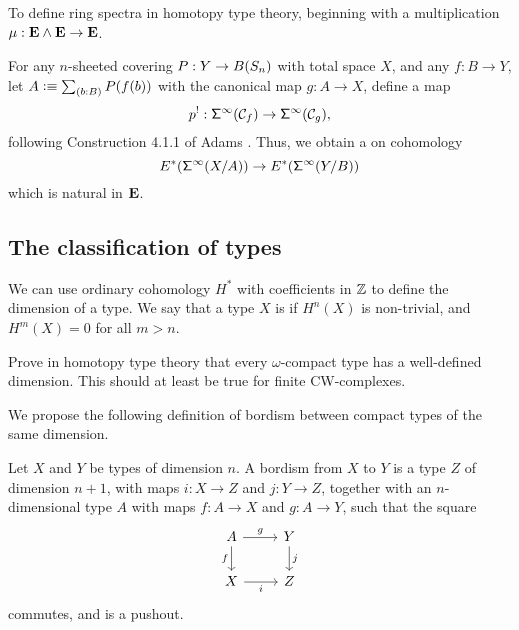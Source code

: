 \documentclass[reqno]{amsart}
\begin{document}
\begin{proposal}\label{p:ring_spectra}
To define ring spectra in homotopy type theory, beginning with a multiplication $\mu:\mathbf{E} \wedge \mathbf{E}\to\mathbf{E}$. 
\end{proposal}

\begin{proposal}\label{p:transfer_spectra}
For any $n$-sheeted covering $P:Y\to B(S_{n})$ with total space $X$, and any $f:B\to Y$, 
let $A\defeq \sm{b:B}P(f(b))$ with the canonical map $g:A\to X$, define a map
\begin{equation*}
p^! : \mathsf{\Sigma}^{\infty}(\mathcal{C}_{f})\to\mathsf{\Sigma}^{\infty}(\mathcal{C}_{g}),
\end{equation*}
following Construction 4.1.1 of Adams \cite{Adams78}. Thus, we obtain a 
on cohomology
\begin{equation*}
E^\ast(\mathsf{\Sigma}^{\infty}(X/A))\to E^\ast(\mathsf{\Sigma}^{\infty}(Y/B))
\end{equation*}
which is natural in $\mathbf{E}$.
\end{proposal}

\subsection{The classification of types}

We can use ordinary cohomology $H^\ast$ with coefficients in $\mathbb{Z}$ to define the dimension of a type. We say
that a type $X$ is  if $H^n(X)$ is non-trivial, and
$H^m(X)=0$ for all $m>n$. 

\begin{proposal}\label{p:dimension}
Prove in homotopy type theory that every $\omega$-compact type has a well-defined dimension. This should at least be true for finite CW-complexes.
\end{proposal}

We propose the following definition of bordism between
compact types of the same dimension.

\begin{defn}
Let $X$ and $Y$ be types of dimension $n$. A bordism from $X$ to $Y$
is a type $Z$ of dimension $n+1$, with maps $i:X\to Z$ and $j:Y\to Z$,
together with an $n$-dimensional type $A$ with maps $f:A\to X$ and $g:A\to Y$, 
such that the square
\begin{equation*}
\begin{tikzcd}
A \arrow[r,"g"] \arrow[d,swap,"f"] & Y \arrow[d,"j"] \\
X \arrow[r,swap,"i"] & Z
\end{tikzcd}
\end{equation*}
commutes, and is a pushout.
\end{defn}
\end{document}
